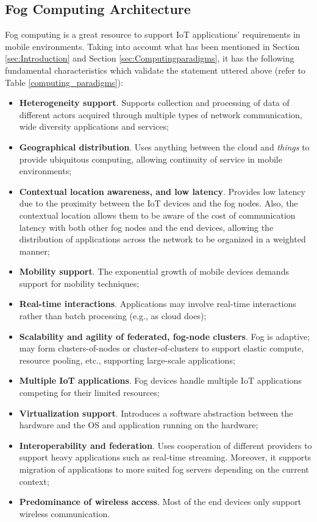 \subsection{Fog Computing Architecture}
\label{sec:fog_architecture}
\noindent Fog computing is a great resource to support IoT applications' requirements in mobile environments. Taking into account what has been mentioned in Section \ref{sec:Introduction} and Section \ref{sec:Computingparadigms}, it has the following fundamental characteristics which validate the statement uttered above (refer to Table \ref{computing_paradigms}):
\begin{itemize}
	\item \textbf{Heterogeneity support}. Supports collection and processing of data of different actors acquired through multiple types of network communication, wide diversity applications and services;
	\item \textbf{Geographical distribution}. Uses anything between the cloud and \textit{things} to provide ubiquitous computing, allowing continuity of service in mobile environments;
	\item \textbf{Contextual location awareness, and low latency}. Provides low latency due to the proximity between the IoT devices and the fog nodes. Also, the contextual location allows them to be aware of the cost of communication latency with both other fog nodes and the end devices, allowing the distribution of applications across the network to be organized in a weighted manner;
	\item \textbf{Mobility support}. The exponential growth of mobile devices demands support for mobility techniques;
	\item \textbf{Real-time interactions}. Applications may involve real-time interactions rather than batch processing (e.g., as cloud does);
	\item \textbf{Scalability and agility of federated, fog-node clusters}. Fog is adaptive; may form clusters-of-nodes or cluster-of-clusters to support elastic compute, resource pooling, etc., supporting large-scale applications;
	\item \textbf{Multiple IoT applications}. Fog devices handle multiple IoT applications competing for their limited resources;
	\item \textbf{Virtualization support}. Introduces a software abstraction between the hardware and the OS and application running on the hardware;
	\item \textbf{Interoperability and federation}. Uses cooperation of different providers to support heavy applications such as real-time streaming. Moreover, it supports migration of applications to more suited fog servers depending on the current context;
	\item \textbf{Predominance of wireless access}. Most of the end devices only support wireless communication.
\end{itemize}

